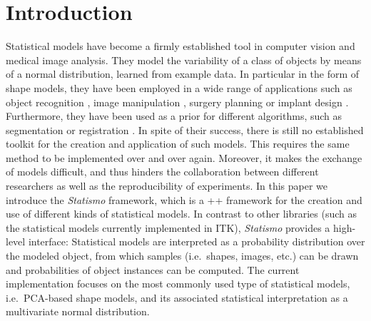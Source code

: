 \documentclass{InsightArticle}
\newcommand{\IJhandlerIDnumber}{3371}
\newcommand{\Statismo}{\emph{Statismo}\xspace}
\begin{document}
\IJhandlenote{\IJhandlerIDnumber}

\tableofcontents

\section{Introduction}

Statistical models have become a firmly established tool in computer
vision and medical image analysis.  They model the variability of a
class of objects by means of a normal distribution,
learned from example data.  In particular in the form of shape models,
they have been employed in a wide range of applications such as object
recognition \cite{cootes_use_1994, paysan_3d_2009}, image manipulation
\cite{blanz_morphable_1999}, surgery planning
\cite{zheng_statistical_2011,hawkes_tissue_2005} or implant design
\cite{bou-sleiman_minimization_2011,kozic_statistical_2009}.
Furthermore, they have been used as a prior for different algorithms,
such as segmentation \cite{heimann_statistical_2009} or registration
\cite{albrecht_statistical_2008}.  In spite of their success, there is
still no established toolkit for the creation and application of such
models. This requires the same method to be implemented over and over
again. Moreover, it makes the exchange of models difficult, and thus
hinders the collaboration between different researchers as well as the
reproducibility of experiments.  In this paper we introduce the
\Statismo framework, which is a \C++ framework for the creation and
use of different kinds of statistical models.  In contrast to other
libraries (such as the statistical models currently implemented in
ITK), \Statismo provides a high-level interface: Statistical models
are interpreted as a probability distribution over the modeled object,
from which samples (i.e.\ shapes, images, etc.)  can be drawn and
probabilities of object instances can be computed.  The current
implementation focuses on the most commonly used type of statistical
models, i.e.\ PCA-based shape models, and its associated statistical
interpretation as a multivariate normal distribution.
\end{document}
